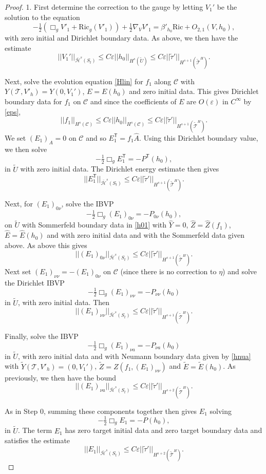 \documentclass[10pt]{amsart}
\renewcommand{\b}{\beta}
\newcommand{\e}{\varepsilon}
\newcommand{\cC}{{\mathcal C}}
\newcommand{\cT}{{\mathcal T}}
\newcommand{\cH}{{\mathcal H}}
\newcommand{\Ric}{\mathrm{Ric}}
\newcommand{\tT}{\mathsf{T}}
\renewcommand{\hat}{\widehat}
\newcommand{\<}{\langle}
\renewcommand{\>}{\rangle}
\newcommand{\w}{\widetilde}
\theoremstyle{plain}
\theoremstyle{remark}
\theoremstyle{definition}
\numberwithin{equation}{section}
\begin{document}
\begin{proof}
1.  First determine the correction to the gauge by letting $V_1'$ be the solution to the equation
$$-\tfrac{1}{2}(\Box_g V'_1+ \Ric_g (V'_1)) + \tfrac{1}{2}\nabla_{V} V'_1 = \b'_{h_0} \Ric + O_{2,1}(V,h_0),$$
with zero initial and Dirichlet boundary data. As above, we then have the estimate 
$$||V_1'||_{\bar \cH^s(S_t)} \leq C\e ||h_0||_{H^s(\w U)} \leq C\e ||\w \tau'||_{H^{s+1}(\w \cT^H)}.$$

  Next, solve the evolution equation \eqref{Hlin} for $f_1$ along $\cC$ with $Y(\cT, V'_h) = Y(0, V_1')$, $E = E(h_0)$ and zero initial data. This gives 
Dirichlet boundary data for $f_1$ on $\cC$ and since the coefficients of $E$ are $O(\e)$ in $C^{\infty}$ by \eqref{eps}, 
$$||f_1||_{H^s(\cC)} \leq C\e ||h_0||_{H^s(\cC)} \leq C\e ||\w \tau'||_{H^{s+1}(\w \cT^H)}.$$
We set $(E_1)_A = 0$ on $\cC$ and so $E_1^{\tT} = f_1 \hat A$. Using this Dirichlet boundary value, we then solve 
$$-\tfrac{1}{2}\Box_g E_1^{\tT} = -P^{\tT}(h_0),$$
in $\w U$ with zero initial data. The Dirichlet energy estimate then gives 
$$||E_1^{\tT}||_{\bar \cH^s(S_t)} \leq C \e ||\w \tau'||_{H^{s+1}(\w \cT^H)}.$$


  Next, for $(E_1)_{0\nu}$, solve the IBVP 
$$-\tfrac{1}{2}\Box_g (E_1)_{0\nu} = -P_{0\nu}(h_0),$$
on $\w U$ with Sommerfeld boundary data in \eqref{h01} with $\hat Y = 0$, $\hat Z = \hat Z(f_1)$, $\hat E = \hat E(h_0)$ and with zero 
initial data and with the Sommerfeld data given above. As above this gives 
$$||(E_1)_{0\nu}||_{\bar \cH^s(S_t)} \leq C \e ||\w \tau'||_{H^{s+1}(\w \cT^H)}.$$
Next set $(E_1)_{\nu \nu} = -(E_1)_{0\nu}$ on $\cC$ (since there is no correction to $\eta$) and solve the Dirichlet IBVP 
$$-\tfrac{1}{2}\Box_g (E_1)_{\nu \nu} = -P_{\nu \nu}(h_0)$$
in $\w U$, with zero initial data. Then  
$$||(E_1)_{\nu\nu}||_{\bar \cH^s(S_t)} \leq C \e ||\w \tau'||_{H^{s+1}(\w \cT^H)}.$$

  Finally, solve the IBVP 
$$-\tfrac{1}{2}\Box_g (E_1)_{\nu a} = -P_{\nu a}(h_0)$$
in $\w U$, with zero initial data and with Neumann boundary data given by \eqref{hnua} with $\w Y(\cT, V'_h) = (0, V_1')$, $\w Z = Z(f_1, (E_1)_{\nu \nu})$ 
and $\w E = \w E(h_0)$. As previously, we then have the bound  
$$||(E_1)_{\nu a}||_{\bar \cH^s(S_t)} \leq  C\e||\w \tau'||_{H^{s+2}(\w \cT^H)}.$$


  As in Step 0, summing these components together then gives $E_1$ solving 
$$-\tfrac{1}{2}\Box_g E_1  = -P(h_0),$$
in $\w U$. The term $E_1$ has zero target initial data and zero target boundary data and satisfies the estimate 
$$||E_1||_{\bar \cH^s(S_t)} \leq C\e ||\w \tau'||_{H^{s+2}(\w \cT^H)}.$$


\end{proof}
\end{document}
